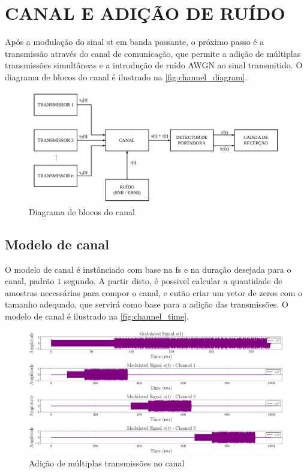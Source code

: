 \section{CANAL E ADIÇÃO DE RUÍDO}\label{sec:canal}


Após a modulação do sinal \gls{st} em banda passante, o próximo passo é a transmissão através do canal de comunicação, que permite a adição de múltiplas transmissões simultâneas e a introdução de ruído \gls{AWGN} ao sinal transmitido. O diagrama de blocos do canal é ilustrado na \autoref{fig:channel_diagram}.

\begin{figure}[H]
	\centering
	\caption{Diagrama de blocos do canal}\label{fig:channel_diagram}
	\includegraphics[width=\linewidth]{assets/diagrams/channel.pdf}
\end{figure}

\subsection{Modelo de canal}\label{sec:modelo_canal}

O modelo de canal é instânciado com base na \gls{fs} e na duração desejada para o canal, padrão $1$ segundo. A partir disto, é possivel calcular a quantidade de amostras necessárias para compor o canal, e então criar um vetor de zeros com o tamanho adequado, que servirá como base para a adição das transmissões. O modelo de canal é ilustrado na \autoref{fig:channel_time}.

\begin{figure}[H]
	\centering
	\caption{Adição de múltiplas transmissões no canal}\label{fig:channel_time}
	\includegraphics[width=\linewidth]{assets/cap3/example_channel_time_subchannels.pdf}
\end{figure}

